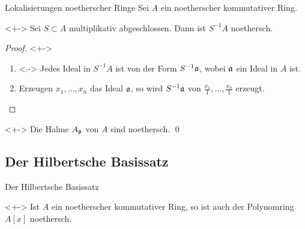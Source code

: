 \begin{frame}{Lokalisierungen noetherscher Ringe}
	Sei \(A\) ein noetherscher kommutativer Ring. 
	\begin{proposition}<+->
		Sei \(S \subset A\) multiplikativ
		abgeschlossen. Dann ist \(S^{-1} A\) noethersch.
	\end{proposition}
	\begin{proof}<+->
		\begin{enumerate}[<+->]
		\item<.->
			Jedes Ideal in \(S^{-1} A\) ist von der Form \(S^{-1} \mathfrak{a}\), wobei
			\(\mathfrak{a}\) ein Ideal in \(A\) ist.
		\item
			Erzeugen \(x_1, \dotsc, x_n\) das Ideal \(\mathfrak{a}\), so wird \(S^{-1} \mathfrak{a}\)
			von \(\frac {x_1} 1, \dotsc, \frac{x_n} 1\) erzeugt.
			\qedhere
		\end{enumerate}
	\end{proof}
	\begin{corollary}<+->
		Die Halme \(A_{\mathfrak{p}}\) von \(A\) sind noethersch.
		\qed
	\end{corollary}
\end{frame}

\subsection{Der Hilbertsche Basissatz}

\begin{frame}{Der Hilbertsche Basissatz}
	\begin{theorem}<+->
		Ist \(A\) ein noetherscher kommutativer Ring, so ist auch der Polynomring \(A[x]\) noethersch.
	\end{theorem}
\end{frame}

